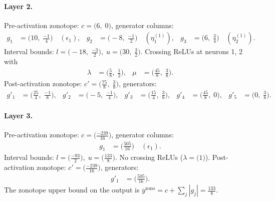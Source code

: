 \documentclass[11pt]{article}
\begin{document}
\paragraph{Layer 2.}
Pre-activation zonotope: $c = \bigl(6,\; 0\bigr)$, generator columns:
\begin{align*}
g_{1} &= \bigl(10,\; \frac{-1}{4}\bigr) \quad (\epsilon_{1}), &
g_{2} &= \bigl(-8,\; \frac{-1}{2}\bigr) \quad (\eta^{(1)}_{1}), &
g_{3} &= \bigl(6,\; \frac{3}{4}\bigr) \quad (\eta^{(1)}_{2}).
\end{align*}
Interval bounds: $l = \bigl(-18,\; \frac{-3}{2}\bigr), \; u = \bigl(30,\; \frac{3}{2}\bigr)$. 
Crossing ReLUs at neurons 1, 2 with
\begin{align*}
\lambda &= \bigl(\frac{5}{8},\; \frac{1}{2}\bigr), & \mu &= \bigl(\frac{45}{8},\; \frac{3}{8}\bigr).
\end{align*}
Post-activation zonotope: $c' = \bigl(\frac{75}{8},\; \frac{3}{8}\bigr)$, generators:
\begin{align*}
g'_{1} &= \bigl(\frac{25}{4},\; \frac{-1}{8}\bigr), &
g'_{2} &= \bigl(-5,\; \frac{-1}{4}\bigr), &
g'_{3} &= \bigl(\frac{15}{4},\; \frac{3}{8}\bigr), &
g'_{4} &= \bigl(\frac{45}{8},\; 0\bigr), &
g'_{5} &= \bigl(0,\; \frac{3}{8}\bigr).
\end{align*}
\paragraph{Layer 3.}
Pre-activation zonotope: $c = \bigl(\frac{-239}{16}\bigr)$, generator columns:
\begin{align*}
g_{1} &= \bigl(\frac{505}{16}\bigr) \quad (\epsilon_{1}).
\end{align*}
Interval bounds: $l = \bigl(\frac{-93}{2}\bigr), \; u = \bigl(\frac{133}{8}\bigr)$. 
No crossing ReLUs ($\lambda = \bigl(1\bigr)$).
Post-activation zonotope: $c' = \bigl(\frac{-239}{16}\bigr)$, generators:
\begin{align*}
g'_{1} &= \bigl(\frac{505}{16}\bigr).
\end{align*}
The zonotope upper bound on the output is $\overline{y}^{\text{zono}} = c + \sum_j |g_j| = \frac{133}{8}$.
\end{document}
